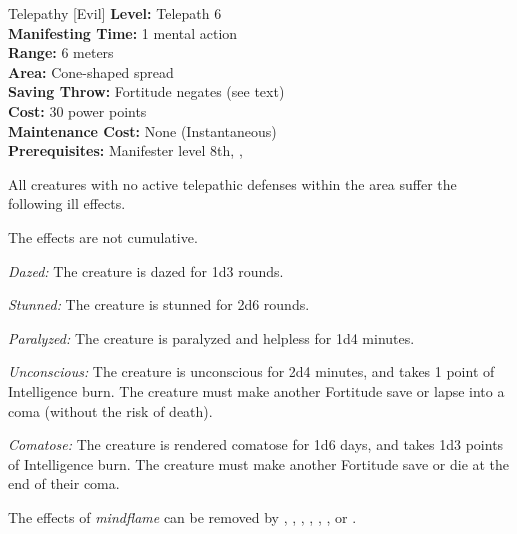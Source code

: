 {Telepathy [Evil]}
{
	\textbf{Level:}
	Telepath 6\\
	\textbf{Manifesting Time:}
	1 mental action\\
	\textbf{Range:}
	6 meters\\
	\textbf{Area:}
	Cone-shaped spread\\
	\textbf{Saving Throw:}
	Fortitude negates (see text)\\
	\textbf{Cost:}
	30 power points\\
	\textbf{Maintenance Cost:}
	None (Instantaneous)\\
	\textbf{Prerequisites:}
	Manifester level 8th, , \\
}
{
	All creatures with no active telepathic defenses within the area suffer the following ill effects.


	The effects are not cumulative.

	\textit{Dazed:} The creature is dazed for 1d3 rounds.

	\textit{Stunned:} The creature is stunned for 2d6 rounds.

	\textit{Paralyzed:} The creature is paralyzed and helpless for 1d4 minutes.

	\textit{Unconscious:} The creature is unconscious for 2d4 minutes, and takes 1 point of Intelligence burn. The creature must make another Fortitude save or lapse into a coma (without the risk of death).

	\textit{Comatose:} The creature is rendered comatose for 1d6 days, and takes 1d3 points of Intelligence burn. The creature must make another Fortitude save or die at the end of their coma.

	The effects of \emph{mindflame} can be removed by , , , , , , or .
}
